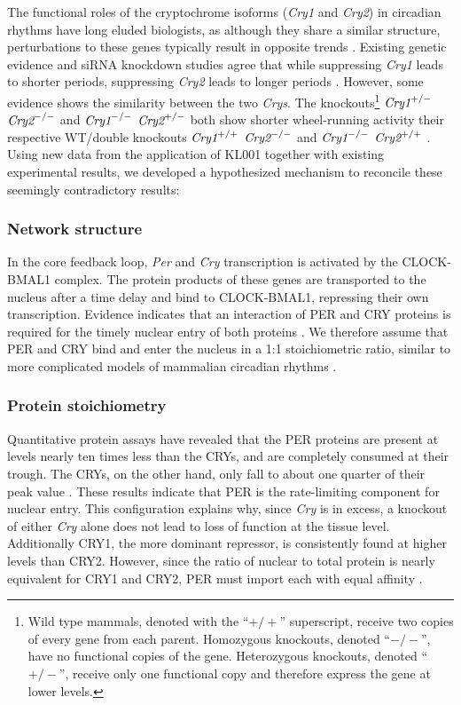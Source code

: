 The functional roles of the cryptochrome isoforms ({\it Cry1} and {\it Cry2}) in circadian rhythms have long eluded biologists, as although they share a similar structure, perturbations to these genes typically result in opposite trends \cite{McCarthy2009}.
Existing genetic evidence and siRNA knockdown studies agree that while suppressing {\it Cry1} leads to shorter periods, suppressing {\it Cry2} leads to longer periods \cite{VanderHorst1999, Zhang2009}.
However, some evidence shows the similarity between the two {\it Crys}.
The knockouts\footnote{Wild type mammals, denoted with the ``$+/+$'' superscript, receive two copies of every gene from each parent. Homozygous knockouts, denoted ``$-/-$'', have no functional copies of the gene. Heterozygous knockouts, denoted ``$+/-$'', receive only one functional copy and therefore express the gene at lower levels.} $\text{\it Cry1}^{+/-}$ $\text{\it Cry2}^{-/-}$ and $\text{\it Cry1}^{-/-}$ $\text{\it Cry2}^{+/-}$ both show shorter wheel-running activity their respective WT/double knockouts $\text{\it Cry1}^{+/+}$ $\text{\it Cry2}^{-/-}$ and $\text{\it Cry1}^{-/-}$ $\text{\it Cry2}^{+/+}$ \cite{VanderHorst1999}.
Using new data from the application of KL001 together with existing experimental results, we developed a hypothesized mechanism to reconcile these seemingly contradictory results:

\subsubsection{Network structure}
In the core feedback loop, {\itshape Per} and {\itshape Cry} transcription is activated by the CLOCK-BMAL1 complex.
The protein products of these genes are transported to the nucleus after a time delay and bind to CLOCK-BMAL1, repressing their own transcription.
Evidence indicates that an interaction of PER and CRY proteins is required for the timely nuclear entry of both proteins \cite{Miyazaki2001,Ko2006,Kume1999}.
We therefore assume that PER and CRY bind and enter the nucleus in a 1:1 stoichiometric ratio, similar to more complicated models of mammalian circadian rhythms \cite{Leloup2003,Mirsky2009,Forger2003}.

\subsubsection{Protein stoichiometry}
Quantitative protein assays have revealed that the PER proteins are present at levels nearly ten times less than the CRYs, and are completely consumed at their trough.
The CRYs, on the other hand, only fall to about one quarter of their peak value  \cite{Lee2001}.
These results indicate that PER is the rate-limiting component for nuclear entry.
This configuration explains why, since {\itshape Cry} is in excess, a knockout of either {\it Cry} alone does not lead to loss of function at the tissue level.
Additionally CRY1, the more dominant repressor, is consistently found at higher levels than CRY2.
However, since the ratio of nuclear to total protein is nearly equivalent for CRY1 and CRY2, PER must import each with equal affinity \cite{Lee2001,Lee2011b}.

